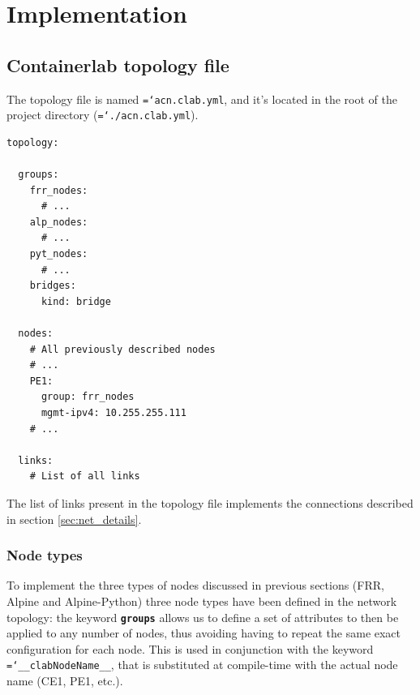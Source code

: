 \documentclass{report}
\newcommand{\monospaced}[1]{\texttt{\hyphenchar\font=`\-#1}}
\newcommand{\monobold}[1]{\texttt{\textbf{#1}}}
\begin{document}
\chapter{Implementation}
\section{Containerlab topology file}
The topology file is named \monospaced{acn.clab.yml}, and it's located in the root of the project directory (\monospaced{./acn.clab.yml}).
\begin{lstlisting}[style=styleYml, caption=acn.clab.yml structure, label=lst:yml_all]
topology:
  
  groups:
    frr_nodes:
      # ...
    alp_nodes:
      # ...
    pyt_nodes:
      # ...
    bridges:
      kind: bridge
      
  nodes:
    # All previously described nodes
    # ...
    PE1:
      group: frr_nodes
      mgmt-ipv4: 10.255.255.111
    # ...
    
  links:
    # List of all links
\end{lstlisting}
The list of links present in the topology file implements the connections described in section \ref{sec:net_details}.
\subsection{Node types}
To implement the three types of nodes discussed in previous sections (FRR, Alpine and Alpine-Python) three node types have been defined in the network topology: the keyword \monobold{groups} allows us to define a set of attributes to then be applied to any number of nodes, thus avoiding having to repeat the same exact configuration for each node. This is used in conjunction with the keyword \monospaced{\_\_clabNodeName\_\_}, that is substituted at compile-time with the actual node name (CE1, PE1, etc.).\newline
\end{document}
